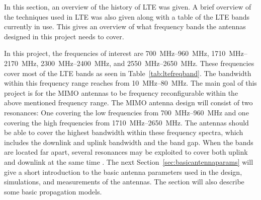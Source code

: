 \begin{aautail}
    In this section, an overview of the history of LTE was given. A brief overview of the techniques used in LTE was also given along with a table of the LTE bands currently in use. This gives an overview of what frequency bands the antennas designed in this project needs to cover.

    In this project, the frequencies of interest are \SIrange{700}{960}{MHz}, \SIrange{1710}{2170}{MHz}, \SIrange{2300}{2400}{MHz}, and \SIrange{2550}{2650}{MHz}. These frequencies cover most of the LTE bands as seen in Table~\ref{tab:ltefreqband}. The bandwidth within this frequency range reaches from \SIrange{10}{80}{MHz}. The main goal of this project is for the MIMO antennas to be frequency reconfigurable within the above mentioned frequency range. The MIMO antenna design will consist of two resonances: One covering the low frequencies from \SIrange{700}{960}{MHz} and one covering the high frequencies from \SIrange{1710}{2650}{MHz}. The antennas should be able to cover the highest bandwidth within these frequency spectra, which includes the downlink and uplink bandwidth and the band gap. When the bands are located far apart, several resonances may be exploited to cover both uplink and downlink at the same time \cite{radio2015electronics}. The next Section~\ref{sec:basicantennaparams} will give a short introduction to the basic antenna parameters used in the design, simulations, and measurements of the antennas. The section will also describe some basic propagation models.
\end{aautail}
